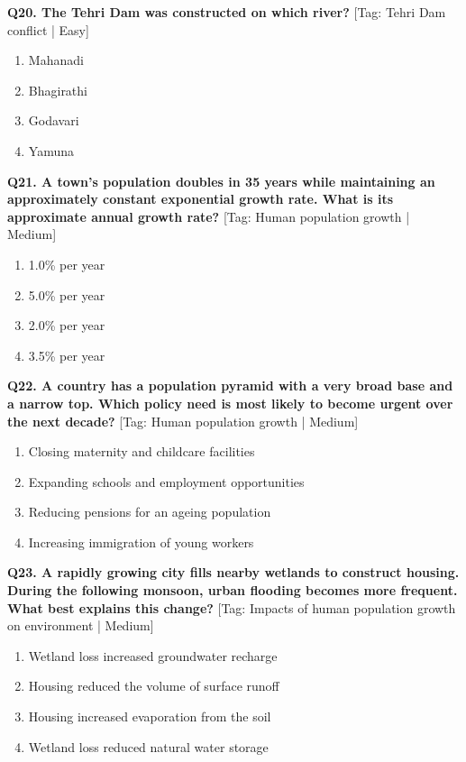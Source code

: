 \noindent\textbf{Q20. The Tehri Dam was constructed on which river?} \hfill [Tag: Tehri Dam conflict | Easy]
\begin{enumerate}[label=(\alph*),topsep=2pt,itemsep=1pt,partopsep=0pt,parsep=0pt]
    \item {Mahanadi}
    \item {Bhagirathi}
    \item {Godavari}
    \item {Yamuna}
\end{enumerate}
\vspace{2mm}

\noindent\textbf{Q21. A town's population doubles in 35 years while maintaining an approximately constant exponential growth rate. What is its approximate annual growth rate?} \hfill [Tag: Human population growth | Medium]
\begin{enumerate}[label=(\alph*),topsep=2pt,itemsep=1pt,partopsep=0pt,parsep=0pt]
    \item {1.0\% per year}
    \item {5.0\% per year}
    \item {2.0\% per year}
    \item {3.5\% per year}
\end{enumerate}
\vspace{2mm}

\noindent\textbf{Q22. A country has a population pyramid with a very broad base and a narrow top. Which policy need is most likely to become urgent over the next decade?} \hfill [Tag: Human population growth | Medium]
\begin{enumerate}[label=(\alph*),topsep=2pt,itemsep=1pt,partopsep=0pt,parsep=0pt]
    \item {Closing maternity and childcare facilities}
    \item {Expanding schools and employment opportunities}
    \item {Reducing pensions for an ageing population}
    \item {Increasing immigration of young workers}
\end{enumerate}
\vspace{2mm}

\noindent\textbf{Q23. A rapidly growing city fills nearby wetlands to construct housing. During the following monsoon, urban flooding becomes more frequent. What best explains this change?} \hfill [Tag: Impacts of human population growth on environment | Medium]
\begin{enumerate}[label=(\alph*),topsep=2pt,itemsep=1pt,partopsep=0pt,parsep=0pt]
    \item {Wetland loss increased groundwater recharge}
    \item {Housing reduced the volume of surface runoff}
    \item {Housing increased evaporation from the soil}
    \item {Wetland loss reduced natural water storage}
\end{enumerate}
\vspace{2mm}

